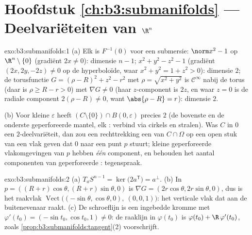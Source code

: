 \section*{Hoofdstuk \ref{ch:b3:submanifolds} --- Deelvariëteiten
van $\R^n$}

\begin{solution}{exo:b3:submanifolds:1}
(a) Elk is $F^{-1}(0)$ voor een submersie: $\norm x^2 - 1$ op
$\R^n\setminus\{0\}$ (gradiënt $2x \neq 0$): dimensie $n-1$; $x^2
+ y^2 - z^2 - 1$ (gradiënt $(2x, 2y, -2z) \neq 0$ op de
hyperboloïde, waar $x^2 + y^2 = 1 + z^2 > 0$): dimensie $2$; de
torusfunctie $G = (\rho - R)^2 + z^2 - r^2$ met $\rho =
\sqrt{x^2+y^2}$ is $\mathcal C^\infty$ nabij de torus (daar is
$\rho \geq R - r > 0$) met $\nabla G \neq 0$ (haar
$z$-component is $2z$, en waar $z = 0$ is de radiale component
$2(\rho - R)\ne0$, want $\abs{\rho - R} = r$): dimensie $2$.

(b) Voor kleine $\varepsilon$ heeft
$(C\setminus\{0\})\cap B(0,\varepsilon)$ precies $2$
 (de bovenste en de onderste geperforeerde
mantel, elk : verbind via cirkels en stralen). Was
$C$ in $0$ een $2$-deelvariëteit, dan zou een rechttrekking een
 van $C\cap\Omega$ op een open stuk van een vlak
geven dat $0$ naar een punt $p$ stuurt; kleine geperforeerde
vlakomgevingen van $p$ hebben \emph{één} component, en
 behouden het aantal componenten van geperforeerde
: tegenspraak.
\end{solution}

\begin{solution}{exo:b3:submanifolds:2}
(a) $T_aS^{n-1} = \ker\bigl(2a^{\mathsf T}\bigr) = a^\perp$.
(b) In $p = ((R+r)\cos\theta, (R+r)\sin\theta, 0)$ is $\nabla G =
(2r\cos\theta, 2r\sin\theta, 0)$, dus is het raakvlak
$\operatorname{Vect}\bigl((-\sin\theta, \cos\theta, 0),\ (0, 0,
1)\bigr)$: het verticale vlak dat aan de buitenevenaar raakt.
(c) De schroeflijn is een ingebedde kromme met $\varphi'(t_0) =
(-\sin t_0, \cos t_0, 1) \neq 0$: de raaklijn in $\varphi(t_0)$
is $\varphi(t_0) + \R\,\varphi'(t_0)$, zoals
\cref{prop:b3:submanifolds:tangent}(2) voorschrijft.
\end{solution}

